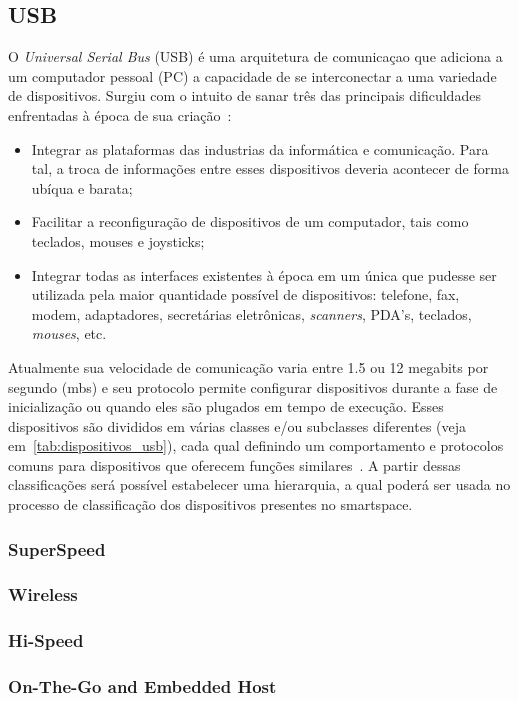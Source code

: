 \subsection{USB}

O \emph{Universal Serial Bus} (USB) é uma arquitetura de comunicaçao que adiciona a um computador pessoal (PC) a capacidade de se interconectar a uma variedade de dispositivos. Surgiu com o intuito de sanar três das principais dificuldades enfrentadas à época de sua criação~\cite{usbspec}:

\begin{itemize}
	\item Integrar as plataformas das industrias da informática e comunicação. Para tal, a troca de informações entre esses dispositivos deveria acontecer de forma ubíqua e barata;
	\item Facilitar a reconfiguração de dispositivos de um computador, tais como teclados, mouses e joysticks;
	\item Integrar todas as interfaces existentes à época em um única que pudesse ser utilizada pela maior quantidade possível de dispositivos: telefone, fax, modem, adaptadores, secretárias eletrônicas, \emph{scanners}, PDA's, teclados, \emph{mouses}, etc.
\end{itemize}

Atualmente sua velocidade de comunicação varia entre 1.5 ou 12 megabits por segundo (mbs) e seu protocolo permite configurar dispositivos durante a fase de inicialização ou quando eles são plugados em tempo de execução. Esses dispositivos são divididos em várias classes e/ou subclasses diferentes (veja em~\ref{tab:dispositivos_usb}), cada qual definindo um comportamento e protocolos comuns para dispositivos que oferecem funções similares~\cite{hid}. A partir dessas classificações será possível estabelecer uma hierarquia, a qual poderá ser usada no processo de classificação dos dispositivos presentes no smartspace.

\subsubsection{SuperSpeed}
\subsubsection{Wireless}
\subsubsection{Hi-Speed}
\subsubsection{On-The-Go and Embedded Host}

